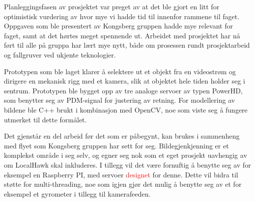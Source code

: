 Planleggingsfasen av prosjektet var preget av at det ble gjort en litt for optimistisk vurdering av hvor mye vi hadde tid til innenfor rammene til faget. Oppgaven som ble presentert av Kongsberg gruppen hadde mye relevant for faget, samt at det hørtes meget spennende ut. Arbeidet med prosjektet har nå ført til alle på gruppa har lært mye nytt, både om prosessen rundt prosjektarbeid og fallgruver ved ukjente teknologier.

Prototypen som ble laget klarer å selektere ut et objekt fra en videostrøm og dirigere en mekanisk rigg med et kamera, slik at objektet hele tiden holder seg i sentrum. Prototypen ble bygget opp av tre analoge servoer av typen PowerHD, som benytter seg av PDM-signal for justering av retning. For modellering av bildene ble C++ brukt i kombinasjon med OpenCV, noe som viste seg å fungere utmerket til dette formålet. 

Det gjenstår en del arbeid før det som er påbegynt, kan brukes i sammenheng med flyet som Kongsberg gruppen har sett for seg. Bildegjenkjenning er et komplekst område i seg selv, og egner seg nok som et eget prosjekt uavhengig av om LocalHawk skal inkluderes. I tillegg vil det være fornuftig å benytte seg av for eksempel en Raspberry PI, med servoer \textcolor{red}{designet} for denne. Dette vil bidra til støtte for multi-threading, noe som igjen gjør det mulig å benytte seg av et for eksempel et gyrometer i tillegg til kamerafeeden.  